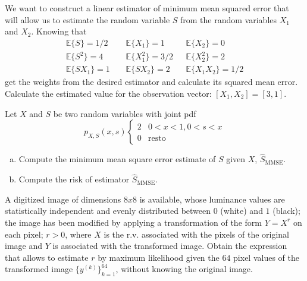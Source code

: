 \begin{prob}
We want to construct a linear estimator of minimum mean squared error that will allow us to estimate the random variable $S$ from the random variables $X_1$ and $X_2$. Knowing that
\begin{equation}
\begin{array}{lll} \mathbb{E}\{S\} = 1/2 & \mathbb{E}\{X_1\} = 1 & \mathbb{E}\{X_2\} = 0 \\ \mathbb{E}\{S^2\} = 4 & \mathbb{E}\{X_1^2\} = 3/2 & \mathbb{E}\{X_2^2\} = 2 \\ \mathbb{E}\{S X_1\} = 1 \;\;\;\;& \mathbb{E}\{S X_2\} = 2 \;\;\;\; & \mathbb{E}\{X_1 X_2\} = 1/2 \end{array}\nonumber
\end{equation}
get the weights from the desired estimator and calculate its squared mean error. Calculate the estimated value for the observation vector: $[X_1,X_2] = [3, 1]$.
\end{prob}


\begin{prob}
\label{ProbEstMSE+Sesgo}

Let $X$ and $S$ be two random variables with joint pdf
\[
p_{X,S}(x,s) \left \{ \begin{array}{ll} 2 & 0<x<1, 0<s<x\\ 0 & \mbox{resto} \end{array} \right.
\]
\begin{enumerate}[a)]
\item Compute the minimum mean square error estimate of $S$ given $X$, $\hat S_{\text{MMSE}}$.
\item Compute the risk of estimator $\hat S_\text{MMSE}$.
\end{enumerate}

\end{prob}


\begin{prob}
\label{ProbEstImagen}

A digitized image of dimensions $8x8$ is available, whose luminance values are statistically independent and evenly distributed between $0$ (white) and $1$ (black); the image has been modified by applying a transformation of the form $Y = X^r$ on each pixel; $r>0$, where $X$ is the r.v. associated with the pixels of the original image and $Y$ is associated with the transformed image. Obtain the expression that allows to estimate $r$ by maximum likelihood given the $64$ pixel values of the transformed image $\{y^{(k)}\}_{k=1}^{64}$, without knowing the original image.

\end{prob}


